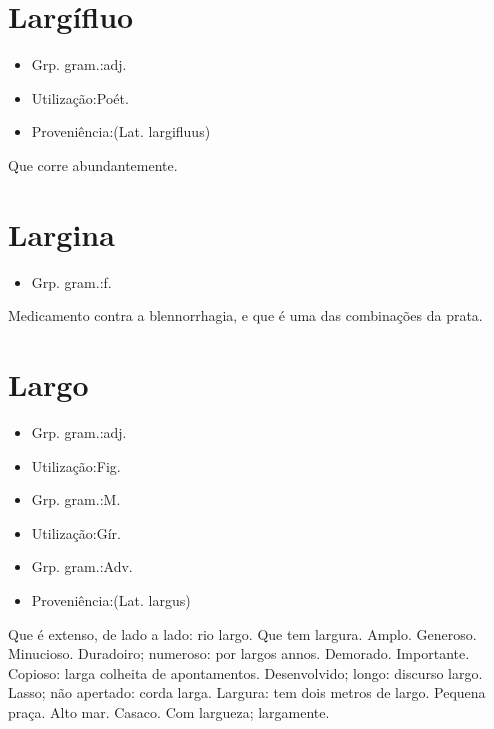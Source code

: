 \section{Largífluo}
\begin{itemize}
\item {Grp. gram.:adj.}
\end{itemize}
\begin{itemize}
\item {Utilização:Poét.}
\end{itemize}
\begin{itemize}
\item {Proveniência:(Lat. \textunderscore largifluus\textunderscore )}
\end{itemize}
Que corre abundantemente.
\section{Largina}
\begin{itemize}
\item {Grp. gram.:f.}
\end{itemize}
Medicamento contra a blennorrhagia, e que é uma das combinações da prata.
\section{Largo}
\begin{itemize}
\item {Grp. gram.:adj.}
\end{itemize}
\begin{itemize}
\item {Utilização:Fig.}
\end{itemize}
\begin{itemize}
\item {Grp. gram.:M.}
\end{itemize}
\begin{itemize}
\item {Utilização:Gír.}
\end{itemize}
\begin{itemize}
\item {Grp. gram.:Adv.}
\end{itemize}
\begin{itemize}
\item {Proveniência:(Lat. \textunderscore largus\textunderscore )}
\end{itemize}
Que é extenso, de lado a lado: \textunderscore rio largo\textunderscore .
Que tem largura.
Amplo.
Generoso.
Minucioso.
Duradoiro; numeroso: \textunderscore por largos annos\textunderscore .
Demorado.
Importante.
Copioso: \textunderscore larga colheita de apontamentos\textunderscore .
Desenvolvido; longo: \textunderscore discurso largo\textunderscore .
Lasso; não apertado: \textunderscore corda larga\textunderscore .
Largura: \textunderscore tem dois metros de largo\textunderscore .
Pequena praça.
Alto mar.
Casaco.
Com largueza; largamente.
